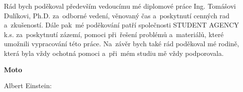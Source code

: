 \documentclass[a4paper,12pt]{article}
\begin{document}
\titulnistrana

\zadani

\prohlaseni

\abstraktaklicovaslova


\clearpage
\thispagestyle{empty}
Rád bych poděkoval především vedoucímu mé diplomové práce Ing. Tomášovi Dulíkovi, Ph.D. za~odborné vedení, věnovaný čas a~poskytnutí cenných rad a~zkušeností. Dále pak~mé poděkování patří společnosti STUDENT AGENCY k.s. za~poskytnutí zázemí, pomoci při~řešení problémů a~materiálů,  které umožnili vypracování této práce. Na~závěr bych také rád poděkoval mé rodině, která byla vždy ochotná pomoci a~při~mém studiu mě vždy podporovala.


\textbf{Moto}

Albert Einstein: 

\obsah  %


\OdsazovaniOdstavcuStart %


\OdsazovaniOdstavcuStop
\end{document}
